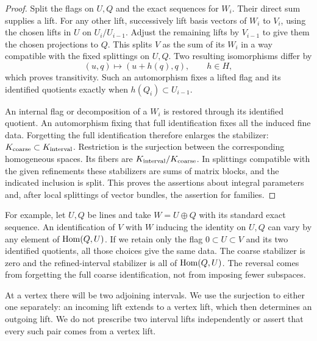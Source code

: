 \begin{proof}
Split the flags on $U,Q$ and the exact sequences for $W_i$.  Their
direct sum supplies a lift.  For any other lift, successively lift
basis vectors of $W_i$ to $V_i$, using the chosen lifts in $U$ on
$U_i/U_{i-1}$.  Adjust the remaining lifts by $V_{i-1}$ to give them
the chosen projections to $Q$.  This splits $V$ as the sum of its
$W_i$ in a way compatible with the fixed splittings on $U,Q$.
Two resulting isomorphisms differ by
\[
 (u,q)\longmapsto(u+h(q),q),\qquad h\in H,
\]
which proves transitivity.  Such an automorphism fixes a lifted flag
and its identified quotients exactly when $h(Q_i)\subset U_{i-1}$.

An internal flag or decomposition of a $W_i$ is restored through its
identified quotient.  An automorphism fixing that full identification
fixes all the induced fine data.  Forgetting the full identification
therefore enlarges the stabilizer:
$K_{\rm coarse}\subset K_{\rm interval}$.  Restriction is the
surjection between the corresponding homogeneous spaces.  Its fibers are
$K_{\rm interval}/K_{\rm coarse}$.  In splittings compatible with
the given refinements these stabilizers are sums of matrix blocks,
and the indicated inclusion is split.  This proves the assertions
about integral parameters and, after local splittings of vector
bundles, the assertion for families.
\end{proof}

For example, let $U,Q$ be lines and take $W=U\oplus Q$ with its
standard exact sequence.  An identification of $V$ with $W$ inducing
the identity on $U,Q$ can vary by any element of $\operatorname{Hom}(Q,U)$.  If we
retain only the flag $0\subset U\subset V$ and its two identified
quotients, all those choices give the same data.  The coarse stabilizer
is zero and the refined-interval stabilizer is all of $\operatorname{Hom}(Q,U)$.
The reversal comes from forgetting the full coarse identification,
not from imposing fewer subspaces.

At a vertex there will be two adjoining intervals.  We use the
surjection to either one separately: an incoming lift extends to a
vertex lift, which then determines an outgoing lift.  We do not
prescribe two interval lifts independently or assert that every such
pair comes from a vertex lift.
